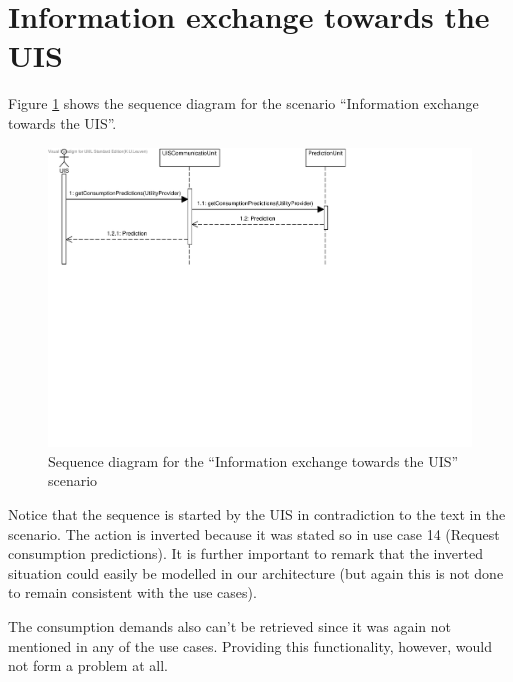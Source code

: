 \section{Information exchange towards the UIS}

\npar Figure \ref{fig:scenario-5-8} shows the sequence diagram for the scenario
``Information exchange towards the UIS''.

\begin{figure}
	\begin{centering}
		\includegraphics[width=\textwidth]{figs/scenario-5-8.pdf}
		\caption{Sequence diagram for the ``Information exchange towards the UIS''
		scenario}
		\label{fig:scenario-5-8}
	\end{centering}
\end{figure}

\npar Notice that the sequence is started by the UIS in contradiction to the
text in the scenario. The action is inverted because it was stated so in use
case 14 (Request consumption predictions). It is further important to remark
that the inverted situation could easily be modelled in our architecture (but
again this is not done to remain consistent with the use cases).

\npar The consumption demands also can't be retrieved since it was again not
mentioned in any of the use cases. Providing this functionality, however, would
not form a problem at all.
